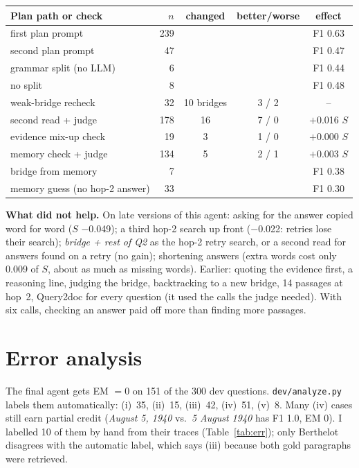 \documentclass[10pt,a4paper]{article}
\begin{document}
\begin{minipage}[t]{0.54\textwidth}
\vspace{0pt}
\centering\footnotesize
\begin{tabular}{@{}lrccc@{}}
\toprule
Plan path or check & $n$ & changed & better/worse & effect\\
\midrule
first plan prompt & 239 & & & F1 0.63\\
second plan prompt & 47 & & & F1 0.47\\
grammar split (no LLM) & 6 & & & F1 0.44\\
no split & 8 & & & F1 0.48\\
\midrule
weak-bridge recheck & 32 & 10 bridges & 3 / 2 & --\\
second read + judge & 178 & 16 & 7 / 0 & $+$0.016 $S$\\
evidence mix-up check & 19 & 3 & 1 / 0 & $+$0.000 $S$\\
memory check + judge & 134 & 5 & 2 / 1 & $+$0.003 $S$\\
\midrule
bridge from memory & 7 & & & F1 0.38\\
memory guess (no hop-2 answer) & 33 & & & F1 0.30\\
\bottomrule
\end{tabular}
\label{tab:steps}
\end{minipage}\hfill
\begin{minipage}[t]{0.43\textwidth}
\vspace{0pt}
\textbf{What did not help.} On late versions of this agent: asking for the answer copied word for word
($S$ $-$0.049); a third hop-2 search up front ($-$0.022: retries lose their search); \emph{bridge + rest of Q2} as
the hop-2 retry search, or a second read for answers found on a retry (no gain); shortening answers (extra words cost
only 0.009 of $S$, about as much as missing words). Earlier: quoting the evidence first, a reasoning line, judging
the bridge, backtracking to a new bridge, 14 passages at hop~2, Query2doc for every question (it used the calls the
judge needed). With six calls, checking an answer paid off more than finding more passages.
\end{minipage}

\section{Error analysis}
The final agent gets EM $=0$ on 151 of the 300 dev questions. \texttt{dev/analyze.py} labels them automatically:
(i)~35, (ii)~15, (iii)~42, (iv)~51, (v)~8. Many (iv) cases still earn partial credit (\emph{August 5, 1940} vs.\
\emph{5 August 1940} has F1 1.0, EM 0). I labelled 10 of them by hand from their traces (Table~\ref{tab:err}); only
Berthelot disagrees with the automatic label, which says (iii) because both gold paragraphs were retrieved.
\end{document}
